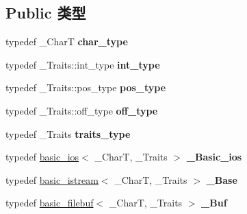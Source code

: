 \subsection*{Public 类型}
\begin{DoxyCompactItemize}
\item 
\mbox{\label{classbasic__ifstream_a61664a4df0143db67c79bfd00113f700}} 
typedef \+\_\+\+CharT {\bfseries char\+\_\+type}
\item 
\mbox{\label{classbasic__ifstream_adc26ca0bb8633c736586d2ec56bd2b71}} 
typedef \+\_\+\+Traits\+::int\+\_\+type {\bfseries int\+\_\+type}
\item 
\mbox{\label{classbasic__ifstream_a0defbd2644043e56d0963d8855f0e5db}} 
typedef \+\_\+\+Traits\+::pos\+\_\+type {\bfseries pos\+\_\+type}
\item 
\mbox{\label{classbasic__ifstream_a685b51b0a5cf92604ec9e036a8bd358a}} 
typedef \+\_\+\+Traits\+::off\+\_\+type {\bfseries off\+\_\+type}
\item 
\mbox{\label{classbasic__ifstream_a62ffe9b2c19992d6ecc20b393f82235c}} 
typedef \+\_\+\+Traits {\bfseries traits\+\_\+type}
\item 
\mbox{\label{classbasic__ifstream_a666c1dc4c7f1d1139247af0232fbd582}} 
typedef \hyperlink{classbasic__ios}{basic\+\_\+ios}$<$ \+\_\+\+CharT, \+\_\+\+Traits $>$ {\bfseries \+\_\+\+Basic\+\_\+ios}
\item 
\mbox{\label{classbasic__ifstream_ad4421b2fb87362ee92165ac2fba0fac1}} 
typedef \hyperlink{classbasic__istream}{basic\+\_\+istream}$<$ \+\_\+\+CharT, \+\_\+\+Traits $>$ {\bfseries \+\_\+\+Base}
\item 
\mbox{\label{classbasic__ifstream_a449a66df4b05dded70c68241549624d0}} 
typedef \hyperlink{classbasic__filebuf}{basic\+\_\+filebuf}$<$ \+\_\+\+CharT, \+\_\+\+Traits $>$ {\bfseries \+\_\+\+Buf}
\end{DoxyCompactItemize}
